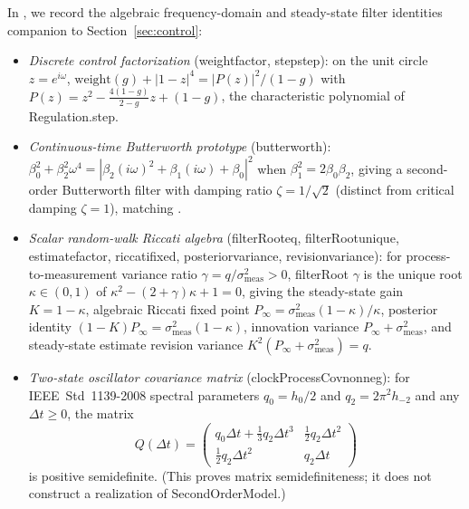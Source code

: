 \documentclass[11pt,a4paper]{article}
\DeclareRobustCommand{\lean}[1]{{\ttfamily\def\_{\textunderscore\allowbreak}#1}}
\theoremstyle{definition}
\begin{document}
In , we record the algebraic
frequency-domain and steady-state filter identities companion to
Section~\ref{sec:control}:
\begin{itemize}
\item \emph{Discrete control factorization} (\lean{weight\_factor},
  \lean{step\_step}): on the unit circle $z = e^{i\omega}$,
  $\mathrm{weight}(g) + |1 - z|^4 = |P(z)|^2 / (1 - g)$ with
  $P(z) = z^2 - \frac{4(1-g)}{2-g} z + (1 - g)$, the characteristic polynomial
  of \lean{Regulation.step}.
\item \emph{Continuous-time Butterworth prototype} (\lean{butterworth}):
  $\beta_0^2 + \beta_2^2\omega^4 = |\beta_2(i\omega)^2 + \beta_1(i\omega) + \beta_0|^2$
  when $\beta_1^2 = 2 \beta_0 \beta_2$, giving a second-order Butterworth filter
  with damping ratio $\zeta = 1/\sqrt{2}$ (distinct from critical damping
  $\zeta = 1$), matching .
\item \emph{Scalar random-walk Riccati algebra} (\lean{filterRoot\_eq},
  \lean{filterRoot\_unique}, \lean{estimate\_factor}, \lean{riccati\_fixed},
  \lean{posterior\_variance}, \lean{revision\_variance}): for process-to-measurement
  variance ratio $\gamma = q / \sigma_{\mathrm{meas}}^2 > 0$, \lean{filterRoot}
  $\gamma$ is the unique root $\kappa \in (0, 1)$ of
  $\kappa^2 - (2 + \gamma)\kappa + 1 = 0$, giving the steady-state gain
  $K = 1 - \kappa$, algebraic Riccati fixed point
  $P_{\infty} = \sigma_{\mathrm{meas}}^2(1 - \kappa)/\kappa$, posterior identity
  $(1 - K)P_{\infty} = \sigma_{\mathrm{meas}}^2(1 - \kappa)$, innovation
  variance $P_{\infty} + \sigma_{\mathrm{meas}}^2$, and steady-state estimate
  revision variance $K^2(P_{\infty} + \sigma_{\mathrm{meas}}^2) = q$.
\item \emph{Two-state oscillator covariance matrix}
  (\lean{clockProcessCov\_nonneg}): for IEEE~Std~1139-2008 spectral parameters
  \cite{ieee1139} $q_0 = h_0/2$ and $q_2 = 2\pi^2 h_{-2}$ and any
  $\Delta t \ge 0$, the matrix
  \[
    Q(\Delta t) =
    \begin{pmatrix}
      q_0 \Delta t + \frac{1}{3} q_2 \Delta t^3 & \frac{1}{2} q_2 \Delta t^2 \\
      \frac{1}{2} q_2 \Delta t^2 & q_2 \Delta t
    \end{pmatrix}
  \]
  is positive semidefinite. (This proves matrix semidefiniteness; it does not
  construct a realization of \lean{SecondOrderModel}.)
\end{itemize}
\end{document}
